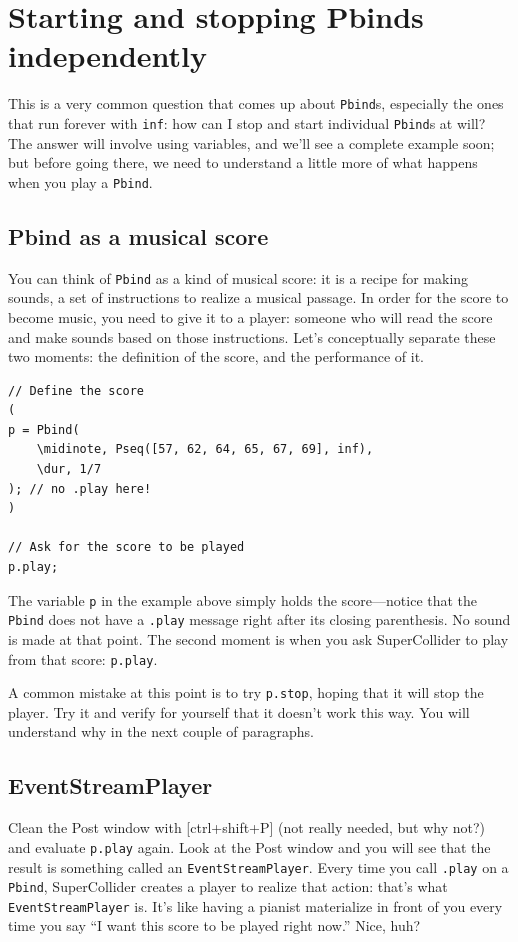 \section{Starting and stopping Pbinds independently}

This is a very common question that comes up about \texttt{Pbind}s, especially the ones that run forever with \texttt{inf}: how can I stop and start individual \texttt{Pbind}s at will? The answer will involve using variables, and we'll see a complete example soon; but before going there, we need to understand a little more of what happens when you play a \texttt{Pbind}.

\subsection{Pbind as a musical score}

You can think of \texttt{Pbind} as a kind of musical score: it is a recipe for making sounds, a set of instructions to realize a musical passage. In order for the score to become music, you need to give it to a player: someone who will read the score and make sounds based on those instructions. Let's conceptually separate these two moments: the definition of the score, and the performance of it. 

 
\begin{lstlisting}[style=SuperCollider-IDE, basicstyle=\scttfamily\footnotesize]
// Define the score
(
p = Pbind(
	\midinote, Pseq([57, 62, 64, 65, 67, 69], inf),
	\dur, 1/7
); // no .play here!
)

// Ask for the score to be played
p.play;
\end{lstlisting}
 

The variable \texttt{p} in the example above simply holds the score---notice that the \texttt{Pbind} does not have a \texttt{.play} message right after its closing parenthesis. No sound is made at that point. The second moment is when you ask SuperCollider to play from that score: \texttt{p.play}.

A common mistake at this point is to try \texttt{p.stop}, hoping that it will stop the player. Try it and verify for yourself that it doesn't work this way. You will understand why in the next couple of paragraphs.

\subsection{EventStreamPlayer}

Clean the Post window with [ctrl+shift+P] (not really needed, but why not?) and evaluate \texttt{p.play} again. Look at the Post window and you will see that the result is something called an \texttt{EventStreamPlayer}. Every time you call \texttt{.play} on a \texttt{Pbind}, SuperCollider creates a player to realize that action: that's what \texttt{EventStreamPlayer} is. It's like having a pianist materialize in front of you every time you say ``I want this score to be played right now.'' Nice, huh?

